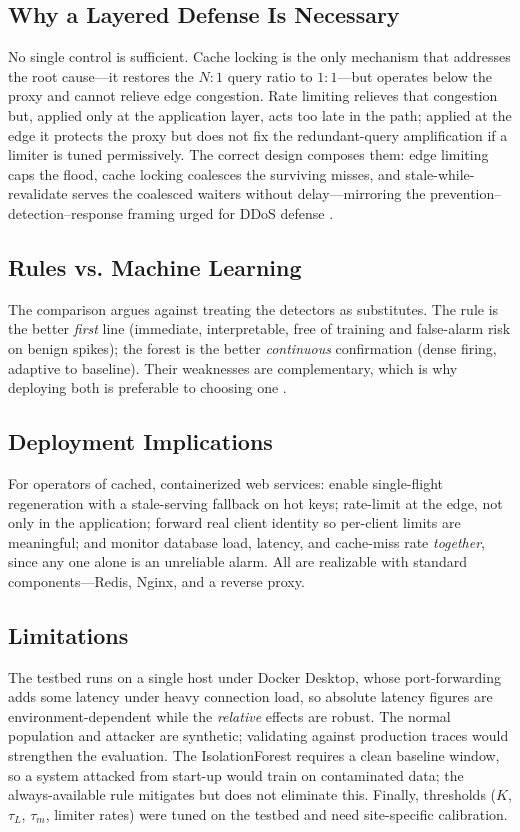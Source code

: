 \documentclass[conference]{IEEEtran}
\begin{document}
\subsection{Why a Layered Defense Is Necessary}
No single control is sufficient. Cache locking is the only mechanism that addresses the
root cause---it restores the $N{:}1$ query ratio to $1{:}1$---but operates below the
proxy and cannot relieve edge congestion. Rate limiting relieves that congestion but,
applied only at the application layer, acts too late in the path; applied at the edge
it protects the proxy but does not fix the redundant-query amplification if a limiter
is tuned permissively. The correct design composes them: edge limiting caps the flood,
cache locking coalesces the surviving misses, and stale-while-revalidate serves the
coalesced waiters without delay---mirroring the prevention--detection--response framing
urged for DDoS defense \cite{zargar2013}.

\subsection{Rules vs. Machine Learning}
The comparison argues against treating the detectors as substitutes. The rule is the
better \emph{first} line (immediate, interpretable, free of training and false-alarm
risk on benign spikes); the forest is the better \emph{continuous} confirmation (dense
firing, adaptive to baseline). Their weaknesses are complementary, which is why
deploying both is preferable to choosing one \cite{chandola2009}.

\subsection{Deployment Implications}
For operators of cached, containerized web services: enable single-flight regeneration
with a stale-serving fallback on hot keys; rate-limit at the edge, not only in the
application; forward real client identity so per-client limits are meaningful; and
monitor database load, latency, and cache-miss rate \emph{together}, since any one
alone is an unreliable alarm. All are realizable with standard components---Redis,
Nginx, and a reverse proxy.

\subsection{Limitations}
The testbed runs on a single host under Docker Desktop, whose port-forwarding adds some
latency under heavy connection load, so absolute latency figures are
environment-dependent while the \emph{relative} effects are robust. The normal
population and attacker are synthetic; validating against production traces would
strengthen the evaluation. The IsolationForest requires a clean baseline window, so a
system attacked from start-up would train on contaminated data; the always-available
rule mitigates but does not eliminate this. Finally, thresholds ($K$, $\tau_L$,
$\tau_m$, limiter rates) were tuned on the testbed and need site-specific calibration.
\end{document}
